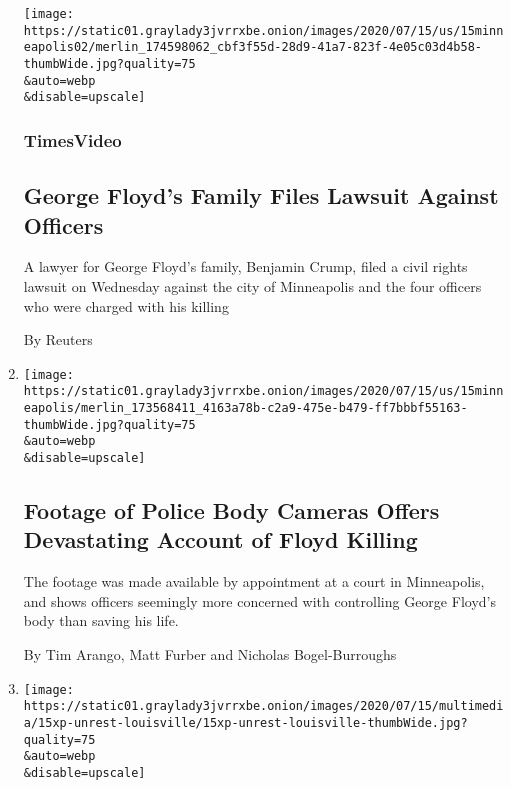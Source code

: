 \begin{enumerate}
  \texttt{[image: https://static01.graylady3jvrrxbe.onion/images/2020/07/15/us/15minneapolis02/merlin\_174598062\_cbf3f55d-28d9-41a7-823f-4e05c03d4b58-thumbWide.jpg?quality=75\\\&auto=webp\\\&disable=upscale]}

  \hypertarget{timesvideo}{%
  \subsubsection{TimesVideo}\label{timesvideo}}

  \hypertarget{george-floyds-family-files-lawsuit-against-officers}{%
  \subsection{George Floyd's Family Files Lawsuit Against
  Officers}\label{george-floyds-family-files-lawsuit-against-officers}}

  A lawyer for George Floyd's family, Benjamin Crump, filed a civil
  rights lawsuit on Wednesday against the city of Minneapolis and the
  four officers who were charged with his killing

  By Reuters
\item
  \href{/2020/07/15/us/george-floyd-video-killing.html}{}

  \texttt{[image: https://static01.graylady3jvrrxbe.onion/images/2020/07/15/us/15minneapolis/merlin\_173568411\_4163a78b-c2a9-475e-b479-ff7bbbf55163-thumbWide.jpg?quality=75\\\&auto=webp\\\&disable=upscale]}

  \hypertarget{footage-of-police-body-cameras-offers-devastating-account-of-floyd-killing}{%
  \subsection{Footage of Police Body Cameras Offers Devastating Account
  of Floyd
  Killing}\label{footage-of-police-body-cameras-offers-devastating-account-of-floyd-killing}}

  The footage was made available by appointment at a court in
  Minneapolis, and shows officers seemingly more concerned with
  controlling George Floyd's body than saving his life.

  By Tim Arango, Matt Furber and Nicholas Bogel-Burroughs
\item
  \href{/2020/07/15/us/protesters-arrested-breonna-taylor-kentucky.html}{}

  \texttt{[image: https://static01.graylady3jvrrxbe.onion/images/2020/07/15/multimedia/15xp-unrest-louisville/15xp-unrest-louisville-thumbWide.jpg?quality=75\\\&auto=webp\\\&disable=upscale]}


\end{enumerate}
